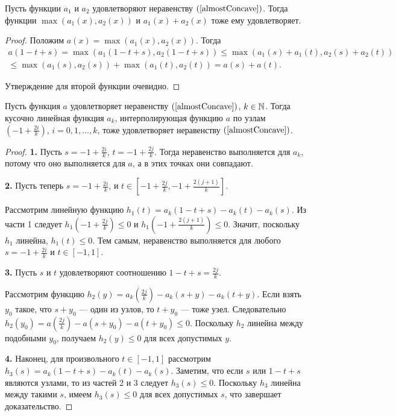 \begin{lm}
\label{maxSumConcave}
Пусть функции $a_1$ и $a_2$ удовлетворяют неравенству $(\ref{almostConcave})$.
Тогда функции $\max (a_1(x), a_2(x))$ и $a_1(x) + a_2(x)$ тоже ему удовлетворяет.
\end{lm}
\begin{proof}
Положим $a(x) = \max (a_1(x), a_2(x))$.
Тогда
\begin{multline*}
a(1 - t + s) = \max(a_1( 1 - t + s), a_2(1 - t + s)) \le
\max(a_1(s) + a_1(t), a_2(s) + a_2(t)) \\
\le \max(a_1(s), a_2(s)) + \max(a_1(t), a_2(t)) =
a(s) + a(t).
\end{multline*}

Утверждение для второй функции очевидно.
\end{proof}

\begin{lm}
\label{piecewiseLinearConcave}
Пусть функция $a$ удовлетворяет неравенству $(\ref{almostConcave})$, $k \in \mathbb N$.
Тогда кусочно линейная функция $a_k$, интерполирующая функцию $a$ по узлам
$(-1 + \frac{2i}{k})$, $i = 0, 1, \dots, k$, тоже удовлетворяет неравенству $(\ref{almostConcave})$.
\end{lm}
\begin{proof}
\textbf{1.}
Пусть $s = -1 + \frac{2i}{k}$, $t = -1 + \frac{2j}{k}$.
Тогда неравенство выполняется для $a_k$, потому что оно выполняется для $a$,
а в этих точках они совпадают.

\textbf{2.}
Пусть теперь $s = -1 + \frac{2i}{k}$, и $t \in [-1 + \frac{2j}{k}, -1 + \frac{2(j + 1)}{k}]$.

Рассмотрим линейную функцию $h_1(t) = a_k( 1 - t + s ) - a_k(t) - a_k(s)$.
Из части 1 следует $h_1(-1 + \frac{2j}{k}) \le 0$ и $h_1(-1 + \frac{2(j + 1)}{k}) \le 0$.
Значит, поскольку $h_1$ линейна, $h_1(t) \le 0$.
Тем самым, неравенство выполняется для любого $s = -1 + \frac{2i}{k}$ и $t \in [-1, 1]$.

\textbf{3.}
Пусть $s$ и $t$ удовлетворяют соотношению $1 - t + s = \frac{2j}{k}$.

Рассмотрим функцию $h_2(y) = a_k(\frac{2j}{k}) - a_k(s + y) - a_k(t + y)$.
Если взять $y_0$ такое, что $s + y_0$ --- один из узлов, то $t + y_0$ --- тоже узел.
Следовательно $h_2(y_0) = a(\frac{2j}{k}) - a(s + y_0) - a(t + y_0) \le 0$.
Поскольку $h_2$ линейна между подобными $y_0$, получаем $h_2(y) \le 0$ для всех допустимых $y$.

\textbf{4.}
Наконец, для произвольного $t \in [-1, 1]$ рассмотрим $h_3(s) = a_k( 1 - t + s ) - a_k(t) - a_k(s)$.
Заметим, что если $s$ или $1 - t + s$ являются узлами, то из частей 2 и 3 следует $h_3(s) \le 0$.
Поскольку $h_3$ линейна между такими $s$, имеем $h_3(s) \le 0$ для всех допустимых $s$, что завершает доказательство.
\end{proof}
